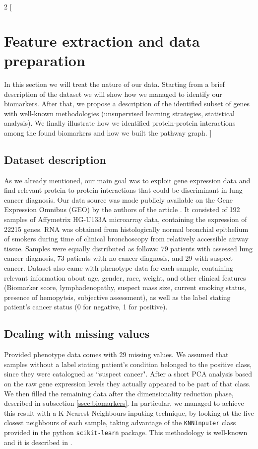 \documentclass{article}
\begin{document}
\begin{multicols}{2}
[
\section{Feature extraction and data preparation}\label{sec:2}
In this section we will treat the nature of our data. Starting from a brief description of the dataset we will show how we managed to identify our biomarkers. After that, we propose a description of the identified subset of genes with well-known methodologies (unsupervised learning strategies, statistical analysis). We finally illustrate how we identified protein-protein interactions among the found biomarkers and how we built the pathway graph.
]

\subsection{Dataset description}
\label{ssec:datasetdesc}
As we already mentioned, our main goal was to exploit gene expression data and find relevant protein to protein interactions that could be discriminant in lung cancer diagnosis. Our data source was made publicly available on the Gene Expression Omnibus (GEO) by the authors of the article \cite{spira2007airway}. It consisted of 192 samples of Affymetrix HG-U133A microarray data, containing the expression of 22215 genes. RNA was obtained from histologically normal bronchial epithelium of smokers during time of clinical bronchoscopy from relatively accessible airway tissue. Samples were equally distributed as follows: 79 patients with assessed lung cancer diagnosis, 73 patients with no cancer diagnosis, and 29 with suspect cancer. Dataset also came with phenotype data for each sample, containing relevant information about age, gender, race, weight, and other clinical features (Biomarker score, lymphadenopathy, suspect mass size, current smoking status, presence of hemopytsis, subjective assessment), as well as the label stating patient's cancer status (0 for negative, 1 for positive).

\subsection{Dealing with missing values}

Provided phenotype data comes with 29 missing values. We assumed that samples without a label stating patient's condition belonged to the positive class, since they were catalogued as ``suspect cancer". After a short PCA analysis based on the raw gene expression levels they actually appeared to be part of that class. We then filled the remaining data after the dimensionality reduction phase, described in subsection \ref{ssec:biomarkers}.
In particular, we managed to achieve this result with a K-Nearest-Neighbours inputing technique, by looking at the five closest neighbours of each sample, taking advantage of the \texttt{KNNInputer} class provided in the python \texttt{scikit-learn} package. This methodology is well-known and it is described in \cite{knninputer}. 


\end{multicols}
\end{document}
